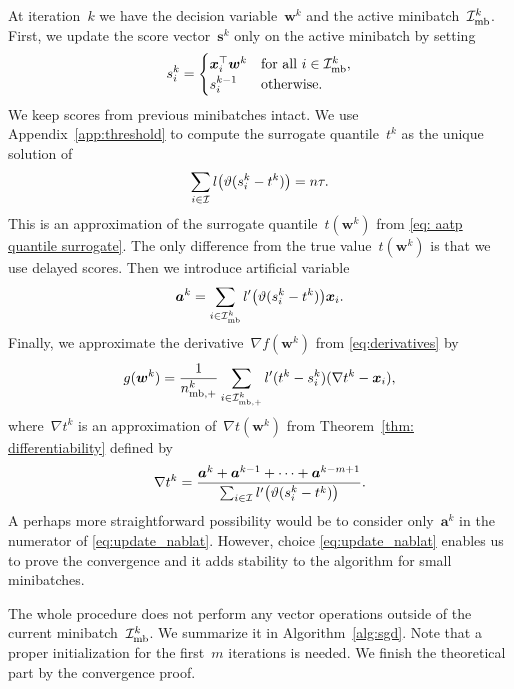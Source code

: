 At iteration~$k$ we have the decision variable~$\bm{w}^k$ and the active minibatch~$\mathcal{I}_{\text{mb}}^k$. First, we update the score vector~$\bm{s}^k$ only on the active minibatch by setting
\begin{equation}\label{eq:defin_z}
  s_i^k = \begin{cases}
    \bm{x}_i^\top \bm{w}^k & \text{for all } i \in \mathcal{I}_{\text{mb}}^k, \\
    s_i^{k-1} & \text{otherwise.}
  \end{cases} 
\end{equation}
We keep scores from previous minibatches intact. We use Appendix~\ref{app:threshold} to compute the surrogate quantile~$t^k$ as the unique solution of
\begin{equation}\label{eq:update_t}
  \sum_{i \in \I}l\Brac{\vartheta(s_i^k - t^k)} = n\tau.
\end{equation}
This is an approximation of the surrogate quantile~$t(\bm{w}^k)$ from \eqref{eq: aatp quantile surrogate}. The only difference from the true value~$t(\bm{w}^k)$ is that we use delayed scores. Then we introduce artificial variable
\begin{equation}\label{eq:update_a}
  \bm{a}^k = \sum_{i \in \Imb^k} l'\Brac{\vartheta(s_i^k - t^k)}\bm{x}_i.
\end{equation}
Finally, we approximate the derivative~$\nabla f(\bm{w}^k)$ from \eqref{eq:derivatives} by
\begin{equation}\label{eq:update_g}
  g(\bm{w}^k) = \frac{1}{n_{\text{mb},+}^k} \sum_{i \in \mathcal{I}_{\text{mb},+}^k} l'(t^k - s_i^k)(\nabla t^k - \bm{x}_i),
\end{equation}
where~$\nabla t^k$ is an approximation of~$\nabla t(\bm{w}^k)$ from Theorem~\ref{thm: differentiability} defined by
\begin{equation}\label{eq:update_nablat}
  \nabla t^k
    = \frac{\bm{a}^k + \bm{a}^{k-1} + \dots + \bm{a}^{k - m + 1}}{\sum_{i \in \I} l'\Brac{\vartheta(s_i^k - t^k)}}.
\end{equation}
A perhaps more straightforward possibility would be to consider only~$\bm{a}^k$ in the numerator of \eqref{eq:update_nablat}. However, choice \eqref{eq:update_nablat} enables us to prove the convergence and it adds stability to the algorithm for small minibatches.

The whole procedure does not perform any vector operations outside of the current minibatch~$\mathcal{I}_{\text{mb}}^k$. We summarize it in Algorithm~\ref{alg:sgd}. Note that a proper initialization for the first~$m$ iterations is needed. We finish the theoretical part by the convergence proof.

